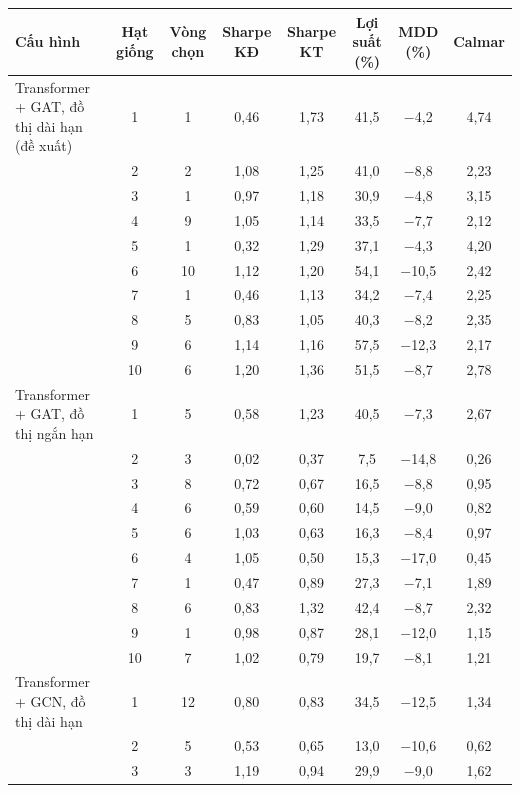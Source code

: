 \begin{tabular}{@{}lccccccc@{}}
\toprule
Cấu hình & Hạt giống & Vòng chọn & Sharpe KĐ & Sharpe KT & Lợi suất (\%) & MDD (\%) & Calmar \\
\midrule
Transformer + GAT, đồ thị dài hạn (đề xuất) & 1 & 1 & 0{,}46 & 1{,}73 & 41{,}5 & $-$4{,}2 & 4{,}74 \\
 & 2 & 2 & 1{,}08 & 1{,}25 & 41{,}0 & $-$8{,}8 & 2{,}23 \\
 & 3 & 1 & 0{,}97 & 1{,}18 & 30{,}9 & $-$4{,}8 & 3{,}15 \\
 & 4 & 9 & 1{,}05 & 1{,}14 & 33{,}5 & $-$7{,}7 & 2{,}12 \\
 & 5 & 1 & 0{,}32 & 1{,}29 & 37{,}1 & $-$4{,}3 & 4{,}20 \\
 & 6 & 10 & 1{,}12 & 1{,}20 & 54{,}1 & $-$10{,}5 & 2{,}42 \\
 & 7 & 1 & 0{,}46 & 1{,}13 & 34{,}2 & $-$7{,}4 & 2{,}25 \\
 & 8 & 5 & 0{,}83 & 1{,}05 & 40{,}3 & $-$8{,}2 & 2{,}35 \\
 & 9 & 6 & 1{,}14 & 1{,}16 & 57{,}5 & $-$12{,}3 & 2{,}17 \\
 & 10 & 6 & 1{,}20 & 1{,}36 & 51{,}5 & $-$8{,}7 & 2{,}78 \\
\midrule
Transformer + GAT, đồ thị ngắn hạn & 1 & 5 & 0{,}58 & 1{,}23 & 40{,}5 & $-$7{,}3 & 2{,}67 \\
 & 2 & 3 & 0{,}02 & 0{,}37 & 7{,}5 & $-$14{,}8 & 0{,}26 \\
 & 3 & 8 & 0{,}72 & 0{,}67 & 16{,}5 & $-$8{,}8 & 0{,}95 \\
 & 4 & 6 & 0{,}59 & 0{,}60 & 14{,}5 & $-$9{,}0 & 0{,}82 \\
 & 5 & 6 & 1{,}03 & 0{,}63 & 16{,}3 & $-$8{,}4 & 0{,}97 \\
 & 6 & 4 & 1{,}05 & 0{,}50 & 15{,}3 & $-$17{,}0 & 0{,}45 \\
 & 7 & 1 & 0{,}47 & 0{,}89 & 27{,}3 & $-$7{,}1 & 1{,}89 \\
 & 8 & 6 & 0{,}83 & 1{,}32 & 42{,}4 & $-$8{,}7 & 2{,}32 \\
 & 9 & 1 & 0{,}98 & 0{,}87 & 28{,}1 & $-$12{,}0 & 1{,}15 \\
 & 10 & 7 & 1{,}02 & 0{,}79 & 19{,}7 & $-$8{,}1 & 1{,}21 \\
\midrule
Transformer + GCN, đồ thị dài hạn & 1 & 12 & 0{,}80 & 0{,}83 & 34{,}5 & $-$12{,}5 & 1{,}34 \\
 & 2 & 5 & 0{,}53 & 0{,}65 & 13{,}0 & $-$10{,}6 & 0{,}62 \\
 & 3 & 3 & 1{,}19 & 0{,}94 & 29{,}9 & $-$9{,}0 & 1{,}62 \\

\end{tabular}
